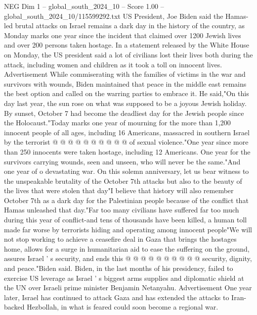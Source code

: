 \begin{textsample}{NEG Dim 1 – global\_south\_2024\_10 – Score 1.00 – global\_south\_2024\_10/115599292.txt}  \label{ex:f1_neg_429}
US President, Joe Biden said the Hamas-led brutal attacks on Israel remains a dark day in the history of the country, as Monday marks one year since the incident that claimed over 1200 Jewish lives and over 200 persons taken hostage.
In a statement released by the White House on Monday, the US president said a lot of civilians lost their lives both during the attack, including women and children as it took a toll on innocent lives.
Advertisement While commiserating with the families of victims in the war and survivors with wounds, Biden maintained that peace in the middle east remains the best option and called on the warring parties to embrace it.
He said,"On this day last year, the sun rose on what was supposed to be a joyous Jewish holiday.
By sunset, October 7 had become the deadliest day for the Jewish people since the Holocaust."Today marks one year of mourning for the more than 1,200 innocent people of all ages, including 16 Americans, massacred in southern Israel by the terrorist @ @ @ @ @ @ @ @ @ @ of sexual violence."One year since more than 250 innocents were taken hostage, including 12 Americans.
One year for the survivors carrying wounds, seen and unseen, who will never be the same."And one year of o devastating war.
On this solemn anniversary, let us bear witness to the unspeakable brutality of the October 7th attacks but also to the beauty of the lives that were stolen that day"I believe that history will also remember October 7th as a dark day for the Palestinian people because of the conflict that Hamas unleashed that day."Far too many civilians have suffered far too much during this year of conflict-and tens of thousands have been killed, a human toll made far worse by terrorists hiding and operating among innocent people"We will not stop working to achieve a ceasefire deal in Gaza that brings the hostages home, allows for a surge in humanitarian aid to ease the suffering on the ground, assures Israel ' s security, and ends this @ @ @ @ @ @ @ @ @ @ security, dignity, and peace."Biden said.
Biden, in the last months of his presidency, failed to exercise US leverage as Israel ' s biggest arms supplies and diplomatic shield at the UN over Israeli prime minister Benjamin Netanyahu.
Advertisement One year later, Israel has continued to attack Gaza and has extended the attacks to Iran-backed Hezbollah, in what is feared could soon become a regional war.

\end{textsample}
